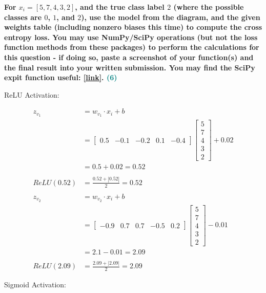 \documentclass[a4paper]{article}
\begin{document}
\begin{sloppypar}
\begin{enumerate}[start=1,label=Q\arabic*,left=0pt]
    \textbf{For $x_i = [5, 7, 4, 3, 2]$, and the true class label $2$ (where the possible classes are $0$, $1$, and
    $2$), use the model from the diagram, and the given weights table (including nonzero biases
    this time) to compute the cross entropy loss. You may use NumPy/SciPy operations (but
    not the loss function methods from these packages) to perform the calculations for this
    question - if doing so, paste a screenshot of your function(s) and the final result into your
    written submission. You may find the SciPy expit function useful: \href{https://docs.scipy.org/doc/scipy/reference/generated/scipy.special.expit.html\#scipy.special.expit}{[link]}. \hfill \textcolor{teal}{(6)}}
    
    ReLU Activation:

    \begin{align*}
        z_{v_1} &= w_{v_1} \cdot x_i + b \\
        &= \begin{bmatrix}0.5 & -0.1 & -0.2 & 0.1 & -0.4\end{bmatrix} \begin{bmatrix} 5 \\ 7 \\ 4 \\ 3 \\ 2 \end{bmatrix} + 0.02 \\
        &= 0.5 + 0.02 = 0.52 \\\\
        ReLU(0.52) &= \frac{0.52 + |0.52|}{2} = 0.52 \\\\
        z_{v_2} &= w_{v_2} \cdot x_i + b \\
        &= \begin{bmatrix}-0.9 & 0.7 & 0.7 & -0.5 & 0.2\end{bmatrix} \begin{bmatrix} 5 \\ 7 \\ 4 \\ 3 \\ 2 \end{bmatrix} - 0.01 \\
        &= 2.1 - 0.01 = 2.09 \\\\
        ReLU(2.09) &= \frac{2.09 + |2.09|}{2} = 2.09
    \end{align*} 

    Sigmoid Activation:


\end{enumerate}
\end{sloppypar}
\end{document}
